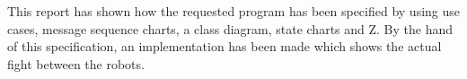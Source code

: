 This report has shown how the requested program has been specified by using use cases, message sequence charts, a class diagram, state charts and Z. 
By the hand of this specification, an implementation has been made which shows the actual fight between the robots.

